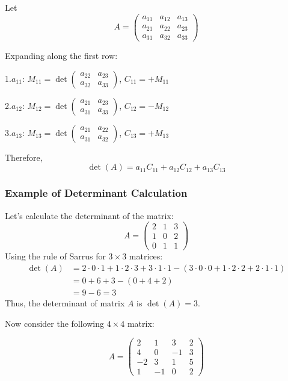 Let
\[
A = \begin{pmatrix}
a_{11} & a_{12} & a_{13} \\
a_{21} & a_{22} & a_{23} \\
a_{31} & a_{32} & a_{33}
\end{pmatrix}
\]

Expanding along the first row:

1.\(a_{11}\):  \(M_{11} = \det \begin{pmatrix} a_{22} & a_{23} \\ a_{32} & a_{33} \end{pmatrix}\),  \(C_{11} = +M_{11}\)

2.\(a_{12}\):  \(M_{12} = \det \begin{pmatrix} a_{21} & a_{23} \\ a_{31} & a_{33} \end{pmatrix}\),  \(C_{12} = -M_{12}\)

3.\(a_{13}\):  \(M_{13} = \det \begin{pmatrix} a_{21} & a_{22} \\ a_{31} & a_{32} \end{pmatrix}\),  \(C_{13} = +M_{13}\)

Therefore,
\[
\det(A) = a_{11}C_{11} + a_{12}C_{12} + a_{13}C_{13}
\]


\subsubsection{Example of Determinant Calculation}
Let's calculate the determinant of the matrix:
\begin{equation*}
A =
\begin{pmatrix}
2 & 1 & 3 \\
1 & 0 & 2 \\
0 & 1 & 1
\end{pmatrix}
\end{equation*}
Using the rule of Sarrus for \(3 \times 3\) matrices:
\begin{align*}
\det(A) &= 2 \cdot 0 \cdot 1 + 1 \cdot 2 \cdot 3 + 3 \cdot 1 \cdot 1 - (3 \cdot 0 \cdot 0 + 1 \cdot 2 \cdot 2 + 2 \cdot 1 \cdot 1) \\
&= 0 + 6 + 3 - (0 + 4 + 2) \\
&= 9 - 6 = 3
\end{align*}
 Thus, the determinant of matrix \(A\) is \(\det(A) = 3\).

 Now consider the following \(4 \times 4\) matrix:

\begin{equation*}
A = 
\begin{pmatrix}
2 & 1 & 3 & 2 \\
4 & 0 & -1 & 3 \\
-2 & 3 & 1 & 5 \\
1 & -1 & 0 & 2
\end{pmatrix}
\end{equation*}

